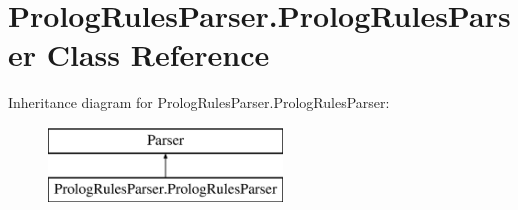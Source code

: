 \hypertarget{class_prolog_rules_parser_1_1_prolog_rules_parser}{}\section{Prolog\+Rules\+Parser.\+Prolog\+Rules\+Parser Class Reference}
\label{class_prolog_rules_parser_1_1_prolog_rules_parser}
Inheritance diagram for Prolog\+Rules\+Parser.\+Prolog\+Rules\+Parser\+:\begin{figure}[H]
\begin{center}
\leavevmode
\includegraphics[height=2.000000cm]{class_prolog_rules_parser_1_1_prolog_rules_parser}
\end{center}
\end{figure}
